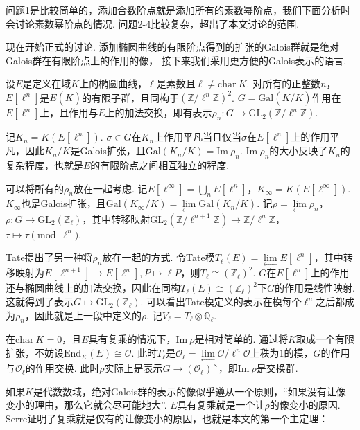 问题1是比较简单的，添加合数阶点就是添加所有的素数幂阶点，我们下面分析时会讨论素数幂阶点的情况.
问题2-4比较复杂，超出了本文讨论的范围.

\vskip0.3cm

现在开始正式的讨论.
添加椭圆曲线的有限阶点得到的扩张的Galois群就是绝对Galois群在有限阶点上的作用的像，
接下来我们采用更方便的Galois表示的语言.

设$E$是定义在域$K$上的椭圆曲线，$\ell$是素数且$\ell\neq \mathrm{char}\ K$. 对所有的正整数$n$，$E[\ell^n]$是$E(\overline{K})$的有限子群，且同构于$(\mathbb{Z}/\ell^n\mathbb{Z})^2$. $G = \mathrm{Gal}(\overline{K}/K)$作用在$E[\ell^n]$上，且作用与$E$上的加法交换，即有表示$\rho_n:G\to \mathrm{GL}_2(\mathbb{Z}/\ell^n \mathbb{Z})$.

记$K_n=K(E[\ell^n])$. $\sigma\in G$在$K_n$上作用平凡当且仅当$\sigma$在$E[\ell^n]$上的作用平凡，因此$K_n/K$是Galois扩张，且$\mathrm{Gal}(K_n/K)=\mathrm{Im}\ \rho_n$. $\mathrm{Im}\ \rho_n$的大小反映了$K_n$的复杂程度，也就是$E$的有限阶点之间相互独立的程度.

可以将所有的$\rho_n$放在一起考虑. 记$E[\ell^{\infty}]=\bigcup_n E[\ell^n]$，$K_{\infty} = K(E[\ell^{\infty}])$. $K_{\infty}$也是Galois扩张，且$\mathrm{Gal}(K_{\infty}/K) = \lim\limits_{\longleftarrow} \mathrm{Gal}(K_n/K)$. 记$\rho = \lim\limits_{\longleftarrow} \rho_n$，$\rho: G\to \mathrm{GL}_2(\mathbb{Z}_{\ell})$，其中转移映射$\mathrm{GL}_2(\mathbb{Z}/\ell^{n+1} \mathbb{Z}) \to \mathbb{Z}/\ell^n \mathbb{Z}$，$\tau \mapsto \tau \pmod{\ell^n}$.

Tate提出了另一种将$\rho_n$放在一起的方式. 令Tate模$T_{\ell}(E) = \lim\limits_{\longleftarrow} E[\ell^n]$，其中转移映射为$E[\ell^{n+1}]\to E[\ell^n], P\mapsto \ell P$，则$T_{\ell}\cong (\mathbb{Z}_{\ell})^2$. $G$在$E[\ell^n]$上的作用还与椭圆曲线上的加法交换，因此在同构$T_{\ell}(E)\cong (\mathbb{Z}_{\ell})^2$下$G$的作用是线性映射. 这就得到了表示$G\mapsto \mathrm{GL}_2(\mathbb{Z}_{\ell})$. 可以看出Tate模定义的表示在模每个$\ell^n$之后都成为$\rho_n$，因此就是上一段中定义的$\rho$.
记$V_{\ell} = T_{\ell}\otimes \mathbb{Q}_{\ell}$.

在$\mathrm{char}\ K = 0$，且$E$具有复乘的情况下，$\mathrm{Im}\ \rho$是相对简单的. 通过将$K$取成一个有限扩张，不妨设$\mathrm{End}_K(E) \cong \mathcal{O}$. 此时$T_{\ell}$是$\mathcal{O}_{\ell} = \lim\limits_{\longleftarrow}\mathcal{O}/\ell^n \mathcal{O}$上秩为$1$的模，$G$的作用与$\mathcal{O}_{\ell}$的作用交换. 此时$\rho$实际上是表示$G\to (\mathcal{O}_{\ell})^{\times}$，即$\mathrm{Im}\ \rho$是交换群.

如果$K$是代数数域，绝对Galois群的表示的像似乎遵从一个原则，“如果没有让像变小的理由，那么它就会尽可能地大”. $E$具有复乘就是一个让$\rho$的像变小的原因. Serre证明了复乘就是仅有的让像变小的原因，也就是本文的第一个主定理：

